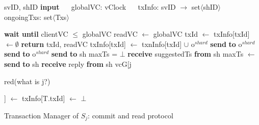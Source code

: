 \documentclass{vldb}
\begin{document}
\begin{algorithm}
	\begin{algorithmic}[1]
		\Statex svID,  shID  
		\Statex \textbf{input}
		\Statex $\quad$ globalVC: vClock  
		\Statex $\quad$ txInfo: svID $\to$ \textsf{set}$\langle$shID$\rangle$ 
		\Statex $\quad$ ongoingTxs: \textsf{set}$\langle$Txs$\rangle$ 
		
			\State \textbf{wait until} clientVC $\leq$ globalVC
			\State readVC $\leftarrow$ globalVC
			\State txId $\leftarrow$ 
			\State txInfo[txId] $\leftarrow \emptyset$ 
			\State \textbf{return} txId, readVC
		\EndFunction
			\State txInfo[txId] $\leftarrow$ txnInfo[txId] $\cup$ o$^{\mathit{shard}}$	
			\State \textbf{send}  \textbf{to} o$^{\mathit{shard}}$
		\EndFunction
			\State \textbf{send}  \textbf{to} o$^{\mathit{shard}}$
		\EndFunction
			 
				\State \textbf{send}  \textbf{to} sh	\label{alg_line:prepare}
			\EndFor
			\State maxTs = $\bot$	
				\State  \textbf{receive} suggestedTs \textbf{from} sh
				\State maxTs $\leftarrow$  \label{alg_line:maxTs}
			\EndFor
				\State \textbf{send}  \textbf{to} sh \label{alg_line:commitSend}
			\EndFor
		\EndFunction
				\State  \textbf{receive} reply \textbf{from} sh
				\EndFor
			\State vcG[j \begin{color}{red}(what is j?)\end{color}]  $\leftarrow$ 
			\State txInfo[T.txId] $\leftarrow$  $\bot$ 
			\EndFor
		\EndFunction
	\end{algorithmic}
	\caption{Transaction Manager of $S_j$: commit and read protocol}
	\label{alg:commit_tm}
\end{algorithm}
\end{document}

